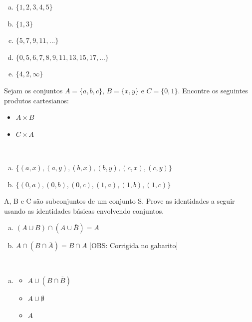 \documentclass[a4paper, 12pt, addpoints]{exam}
\begin{document}
\begin{questions}
\begin{resp}
    \begin{multicols}{2}
    \begin{enumerate}[a)]
        \item $\{1,2,3,4,5\}$
        \item $\{1,3\}$
        \item $\{5,7,9,11,...\}$
        \item $\{0,5,6,7,8,9,11,13,15,17,...\}$
        \item $\{ 4, 2, \infty\}$
    \end{enumerate}
\end{multicols}
    
\end{resp}

\question Sejam os conjuntos $A = \{a, b, c\}$, $B = \{x, y\}$ e $C = \{0, 1\}$. Encontre os seguintes produtos cartesianos:
\begin{itemize}[a)]
    \item $A \times B$
    \item $C \times A$
\end{itemize}

\begin{resp}~
    
    \begin{enumerate}[a)]
        \item $\{(a,x),(a,y),(b,x),(b,y),(c,x),(c,y)\}$
        \item $\{(0,a),(0,b),(0,c),(1,a),(1,b),(1,c)\}$
    \end{enumerate}
\end{resp}

\question A, B e C são subconjuntos de um conjunto S. Prove as identidades a seguir usando as identidades básicas envolvendo conjuntos.
\begin{enumerate}[a)]
    \item $(A \cup B) \cap (A \cup \overline{B}) = A$
    \item $A \cap (B \cap \overline{A}) = B \cap A$ [OBS: Corrigida no gabarito]
\end{enumerate}

\begin{resp}~
    
    \begin{enumerate}[a)]
    \item 
    \begin{multicols}{2}
        \begin{itemize}
            \item $A \cup (B \cap \overline{B})$
            \item $A \cup \emptyset$
            \item $A$
        \end{itemize}


\end{multicols}
\end{enumerate}
\end{resp}
\end{questions}
\end{document}
